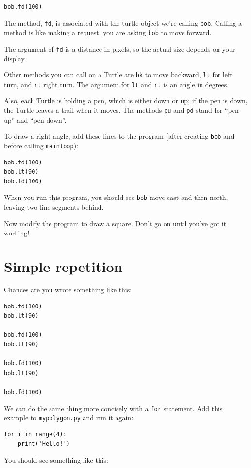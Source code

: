 \documentclass[10pt]{book}
\begin{document}
\begin{verbatim}
bob.fd(100)
\end{verbatim}
%
The method, {\tt fd}, is associated with the turtle
object we're calling {\tt bob}.
Calling a method is like making a request: you are asking {\tt bob}
to move forward.

The argument of {\tt fd} is a distance in pixels, so the actual
size depends on your display.

Other methods you can call on a Turtle are {\tt bk} to move
backward, {\tt lt} for left turn, and {\tt rt} right turn.  The
argument for {\tt lt} and {\tt rt} is an angle in degrees.

Also, each Turtle is holding a pen, which is
either down or up; if the pen is down, the Turtle leaves
a trail when it moves.  The methods {\tt pu} and {\tt pd}
stand for ``pen up'' and ``pen down''.

To draw a right angle, add these lines to the program
(after creating {\tt bob} and before calling \verb"mainloop"):

\begin{verbatim}
bob.fd(100)
bob.lt(90)
bob.fd(100)
\end{verbatim}
%
When you run this program, you should see {\tt bob} move east and then
north, leaving two line segments behind.

Now modify the program to draw a square.  Don't go on until
you've got it working!


\section{Simple repetition}
\label{repetition}

Chances are you wrote something like this:

\begin{verbatim}
bob.fd(100)
bob.lt(90)

bob.fd(100)
bob.lt(90)

bob.fd(100)
bob.lt(90)

bob.fd(100)
\end{verbatim}
%
We can do the same thing more concisely with a {\tt for} statement.
Add this example to {\tt mypolygon.py} and run it again:

\begin{verbatim}
for i in range(4):
    print('Hello!')
\end{verbatim}
%
You should see something like this:
\end{document}
